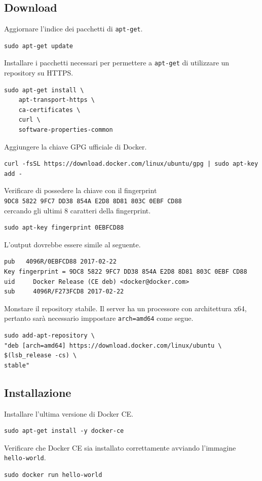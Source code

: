 \subsection{Download}
Aggiornare l'indice dei pacchetti di \verb|apt-get|.
\begin{lstlisting}
sudo apt-get update
\end{lstlisting}
Installare i pacchetti necessari per permettere a \verb|apt-get| di utilizzare un repository su HTTPS.
\begin{lstlisting}
sudo apt-get install \ 
    apt-transport-https \
    ca-certificates \
    curl \
    software-properties-common
\end{lstlisting}
Aggiungere la chiave GPG ufficiale di Docker.
\begin{lstlisting}
curl -fsSL https://download.docker.com/linux/ubuntu/gpg | sudo apt-key add -
\end{lstlisting}
Verificare di possedere la chiave con il fingerprint\\
\verb|9DC8 5822 9FC7 DD38 854A E2D8 8D81 803C 0EBF CD88|\\
cercando gli ultimi 8 caratteri della fingerprint.
\begin{lstlisting}
sudo apt-key fingerprint 0EBFCD88
\end{lstlisting}
L'output dovrebbe essere simile al seguente.
\begin{lstlisting}
pub   4096R/0EBFCD88 2017-02-22
Key fingerprint = 9DC8 5822 9FC7 DD38 854A E2D8 8D81 803C 0EBF CD88
uid     Docker Release (CE deb) <docker@docker.com>
sub     4096R/F273FCD8 2017-02-22
\end{lstlisting}
Monstare il repository stabile. Il server ha un processore con architettura x64, pertanto sarà necessario imppostare \verb|arch=amd64| come segue.
\begin{lstlisting}
sudo add-apt-repository \
"deb [arch=amd64] https://download.docker.com/linux/ubuntu \
$(lsb_release -cs) \
stable"
\end{lstlisting}

\subsection{Installazione}
Installare l'ultima versione di Docker CE.
\begin{lstlisting}
sudo apt-get install -y docker-ce
\end{lstlisting}
Verificare che Docker CE sia installato correttamente avviando l'immagine \verb|hello-world|.
\begin{lstlisting}
sudo docker run hello-world
\end{lstlisting}


